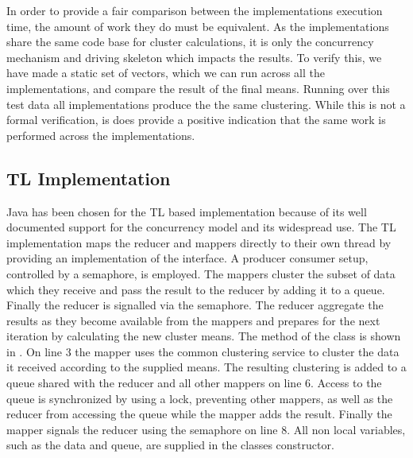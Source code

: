 {In order to provide a fair comparison between the implementations execution time, the amount of work they do must be equivalent. As the implementations share the same code base for cluster calculations, it is only the concurrency mechanism and driving skeleton which impacts the results. To verify this, we have made a static set of vectors, which we can run across all the implementations, and compare the result of the final means. Running over this test data all implementations produce the the same clustering. While this is not a formal verification, is does provide a positive indication that the same work is performed across the implementations.

\subsection{\ac{TL} Implementation}
Java has been chosen for the \ac{TL} based implementation because of its well documented support for the concurrency model and its widespread use. The \ac{TL} implementation maps the reducer and mappers directly to their own thread by providing an implementation of the  interface. A producer consumer setup, controlled by a semaphore, is employed. The mappers cluster the subset of data which they receive and pass the result to the reducer by adding it to a queue. Finally the reducer is signalled via the semaphore. The reducer aggregate the results as they become available from the mappers  and prepares for the next iteration by calculating the new cluster means. The  method of the  class is shown in . On line 3 the mapper uses the common clustering service to cluster the data it received according to the supplied means. The resulting clustering is added to a queue shared with the reducer and all other mappers on line 6. Access to the queue is synchronized by using a lock, preventing other mappers, as well as the reducer from accessing the queue while the mapper adds the result. Finally the mapper signals the reducer using the semaphore on line 8. All non local variables, such as the data and queue, are supplied in the  classes constructor.

\begin{lstlisting}[float,label=lst:tl_implementation,
  caption={\ac{TL} Implementation},
  language=Java,  
  showspaces=false,
  showtabs=false,
  breaklines=true,
  showstringspaces=false,
  breakatwhitespace=true,
  commentstyle=\color{greencomments},
  keywordstyle=\color{bluekeywords},
  stringstyle=\color{redstrings}]  % Start your code-block


\end{lstlisting}}
